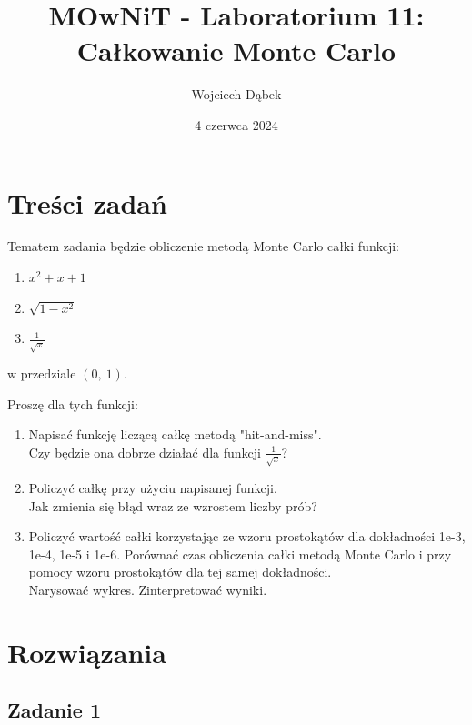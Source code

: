 \documentclass{article}
\title{MOwNiT - Laboratorium 11:\\
Całkowanie Monte Carlo}
\author{Wojciech Dąbek}
\date{4 czerwca 2024}
\begin{document}
\maketitle

\section{Treści zadań}

Tematem zadania będzie obliczenie metodą Monte Carlo całki funkcji:
\begin{enumerate}
    \item \(x^2 + x + 1\)
    \item \(\sqrt{1 - x^2}\)
    \item \(\frac{1}{\sqrt{x}}\)
\end{enumerate}
w przedziale \((0,\ 1)\).

\vspace{5mm}
\noindent
Proszę dla tych funkcji:
\begin{enumerate}
    \item Napisać funkcję liczącą całkę metodą "hit-and-miss".\\
    Czy będzie ona dobrze działać dla funkcji \(\frac{1}{\sqrt{x}}\)?
    \item Policzyć całkę przy użyciu napisanej funkcji.\\
    Jak zmienia się błąd wraz ze wzrostem liczby prób?
    \item Policzyć wartość całki korzystając ze wzoru prostokątów dla dokładności 1e-3, 1e-4, 1e-5 i 1e-6. Porównać czas obliczenia całki metodą Monte Carlo i przy pomocy wzoru prostokątów dla tej samej dokładności.\\
    Narysować wykres. Zinterpretować wyniki.
\end{enumerate}

\newpage

\section{Rozwiązania}

\subsection{Zadanie 1}
\end{document}

